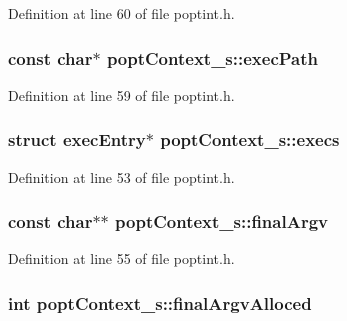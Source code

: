 Definition at line 60 of file poptint.\+h.

\hypertarget{structpopt_context__s_a3a8c9082b8dd21f720c24e492519971c}{}
\subsubsection[{exec\+Path}]{\setlength{\rightskip}{0pt plus 5cm}const char$\ast$ popt\+Context\+\_\+s\+::exec\+Path}\label{structpopt_context__s_a3a8c9082b8dd21f720c24e492519971c}


Definition at line 59 of file poptint.\+h.

\hypertarget{structpopt_context__s_ad78193f12525b099056a152ebdddd5e9}{}
\subsubsection[{execs}]{\setlength{\rightskip}{0pt plus 5cm}struct {\bf exec\+Entry}$\ast$ popt\+Context\+\_\+s\+::execs}\label{structpopt_context__s_ad78193f12525b099056a152ebdddd5e9}


Definition at line 53 of file poptint.\+h.

\hypertarget{structpopt_context__s_ae47d4963c1e3953b55aeec44895c0439}{}
\subsubsection[{final\+Argv}]{\setlength{\rightskip}{0pt plus 5cm}const char$\ast$$\ast$ popt\+Context\+\_\+s\+::final\+Argv}\label{structpopt_context__s_ae47d4963c1e3953b55aeec44895c0439}


Definition at line 55 of file poptint.\+h.

\hypertarget{structpopt_context__s_a22873bd65778f6f1bfb1d4bc5d827bf4}{}
\subsubsection[{final\+Argv\+Alloced}]{\setlength{\rightskip}{0pt plus 5cm}int popt\+Context\+\_\+s\+::final\+Argv\+Alloced}\label{structpopt_context__s_a22873bd65778f6f1bfb1d4bc5d827bf4}


